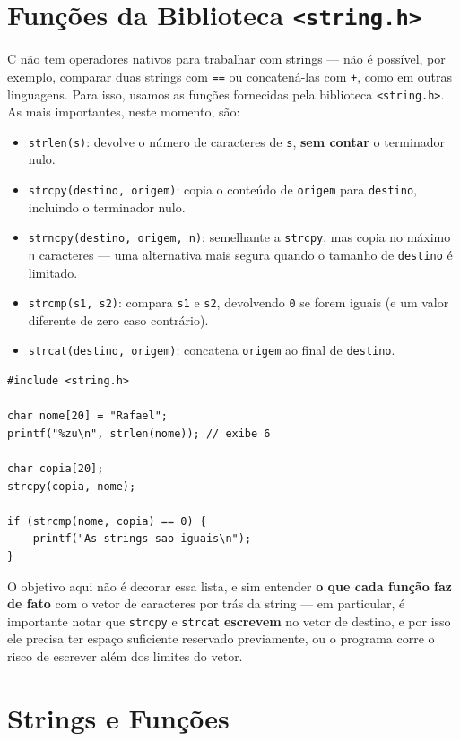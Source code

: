 \documentclass[12pt,a4paper,oneside]{extreport}
\begin{document}
\section{Funções da Biblioteca \texttt{<string.h>}}

C não tem operadores nativos para trabalhar com strings — não é possível, por exemplo, comparar duas strings com \texttt{==} ou concatená-las com \texttt{+}, como em outras linguagens. Para isso, usamos as funções fornecidas pela biblioteca \texttt{<string.h>}. As mais importantes, neste momento, são:

\begin{itemize}
    \item \texttt{strlen(s)}: devolve o número de caracteres de \texttt{s}, \textbf{sem contar} o terminador nulo.
    \item \texttt{strcpy(destino, origem)}: copia o conteúdo de \texttt{origem} para \texttt{destino}, incluindo o terminador nulo.
    \item \texttt{strncpy(destino, origem, n)}: semelhante a \texttt{strcpy}, mas copia no máximo \texttt{n} caracteres — uma alternativa mais segura quando o tamanho de \texttt{destino} é limitado.
    \item \texttt{strcmp(s1, s2)}: compara \texttt{s1} e \texttt{s2}, devolvendo \texttt{0} se forem iguais (e um valor diferente de zero caso contrário).
    \item \texttt{strcat(destino, origem)}: concatena \texttt{origem} ao final de \texttt{destino}.
\end{itemize}

\begin{lstlisting}
#include <string.h>

char nome[20] = "Rafael";
printf("%zu\n", strlen(nome)); // exibe 6

char copia[20];
strcpy(copia, nome);

if (strcmp(nome, copia) == 0) {
    printf("As strings sao iguais\n");
}
\end{lstlisting}

O objetivo aqui não é decorar essa lista, e sim entender \textbf{o que cada função faz de fato} com o vetor de caracteres por trás da string — em particular, é importante notar que \texttt{strcpy} e \texttt{strcat} \textbf{escrevem} no vetor de destino, e por isso ele precisa ter espaço suficiente reservado previamente, ou o programa corre o risco de escrever além dos limites do vetor.

\section{Strings e Funções}
\end{document}
